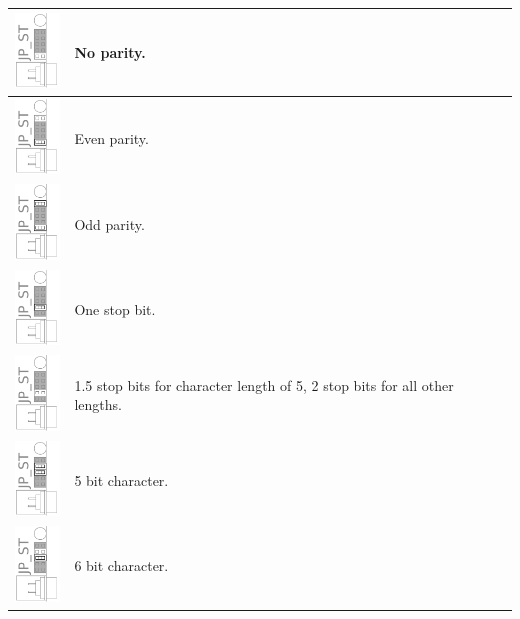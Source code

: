\documentclass[a4paper,10pt]{book}
\begin{document}
\begin{table}[h]
 \begin{tabular}{| l | p{8cm} |}
  \hline
  \includegraphics[height=2cm]{jpst_np.pdf}&No parity.\\
  \hline
  \includegraphics[height=2cm]{jpst_ep.pdf}&Even parity.\\
  \hline
  \includegraphics[height=2cm]{jpst_op.pdf}&Odd parity.\\
  \hline
  \hline
  \includegraphics[height=2cm]{jpst_1sb.pdf}&One stop bit.\\
  \hline
  \includegraphics[height=2cm]{jpst_2sb.pdf}&1.5 stop bits for character length of 5, 2 stop bits for all other lengths.\\
  \hline
  \hline
  \includegraphics[height=2cm]{jpst_5b.pdf}&5 bit character.\\
  \hline
  \includegraphics[height=2cm]{jpst_6b.pdf}&6 bit character.\\

\end{tabular}
\end{table}
\end{document}
